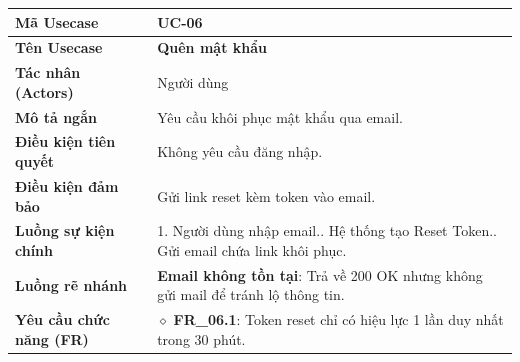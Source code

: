 \begin{table}[H]
\renewcommand{\arraystretch}{1.3}
\centering
\begin{tabularx}{\textwidth}{|p{4.5cm}|X|}
\hline
\cellcolor{gray!15}\bfseries Mã Usecase & \textbf{UC-06} \\ \hline
\cellcolor{gray!15}\bfseries Tên Usecase & \textbf{Quên mật khẩu} \\ \hline
\cellcolor{gray!15}\bfseries Tác nhân (Actors) & Người dùng \\ \hline
\cellcolor{gray!15}\bfseries Mô tả ngắn & Yêu cầu khôi phục mật khẩu qua email. \\ \hline
\cellcolor{gray!15}\bfseries Điều kiện tiên quyết & Không yêu cầu đăng nhập. \\ \hline
\cellcolor{gray!15}\bfseries Điều kiện đảm bảo & Gửi link reset kèm token vào email. \\ \hline
\cellcolor{gray!15}\bfseries Luồng sự kiện chính & 1. Người dùng nhập email.\newline 2. Hệ thống tạo Reset Token.\newline 3. Gửi email chứa link khôi phục. \\ \hline
\cellcolor{gray!15}\bfseries Luồng rẽ nhánh & \textbf{Email không tồn tại}: Trả về 200 OK nhưng không gửi mail để tránh lộ thông tin. \\ \hline
\cellcolor{gray!15}\bfseries Yêu cầu chức năng (FR) & $\diamond$ \textbf{FR\_06.1}: Token reset chỉ có hiệu lực 1 lần duy nhất trong 30 phút. \\ \hline
\end{tabularx}
\end{table}

